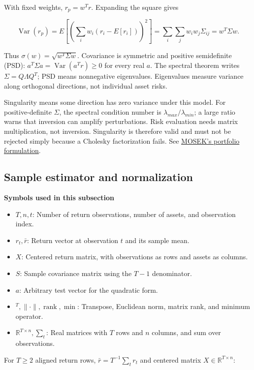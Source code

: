 \documentclass[
  american,
  11pt,
]{article}
\begin{document}
With fixed weights, \(r_p=w^Tr\). Expanding the square gives

\[\operatorname{Var}(r_p)=E\left[\left(\sum_i w_i(r_i-E[r_i])\right)^2\right]
=\sum_i\sum_jw_iw_j\Sigma_{ij}=w^T\Sigma w.\]

Thus \(\sigma(w)=\sqrt{w^T\Sigma w}\). Covariance is symmetric and
positive semidefinite (PSD):
\(a^T\Sigma a=\operatorname{Var}(a^Tr)\ge0\) for every real \(a\). The
spectral theorem writes \(\Sigma=Q\Lambda Q^T\); PSD means nonnegative
eigenvalues. Eigenvalues measure variance along orthogonal directions,
not individual asset risks.

Singularity means some direction has zero variance under this model. For
positive-definite \(\Sigma\), the spectral condition number is
\(\lambda_{max}/\lambda_{min}\); a large ratio warns that inversion can
amplify perturbations. Risk evaluation needs matrix multiplication, not
inversion. Singularity is therefore valid and must not be rejected
simply because a Cholesky factorization fails. See
\href{https://docs.mosek.com/portfolio-cookbook/markowitz.html}{MOSEK's
portfolio formulation}.

\subsection{Sample estimator and
normalization}\label{sample-estimator-and-normalization}

\textbf{Symbols used in this subsection}
\begin{itemize}
\item \(T,n,t\): Number of return observations, number of assets, and observation index.
\item \(r_t,\bar r\): Return vector at observation $t$ and its sample mean.
\item \(X\): Centered return matrix, with observations as rows and assets as columns.
\item \(S\): Sample covariance matrix using the $T-1$ denominator.
\item \(a\): Arbitrary test vector for the quadratic form.
\item \({}^T,\|\cdot\|,\operatorname{rank},\min\): Transpose, Euclidean norm, matrix rank, and minimum operator.
\item \(\mathbb R^{T\times n},\sum_t\): Real matrices with $T$ rows and $n$ columns, and sum over observations.
\end{itemize}


For \(T\ge2\) aligned return rows, \(\bar r=T^{-1}\sum_t r_t\) and
centered matrix \(X\in\mathbb R^{T\times n}\):
\end{document}
